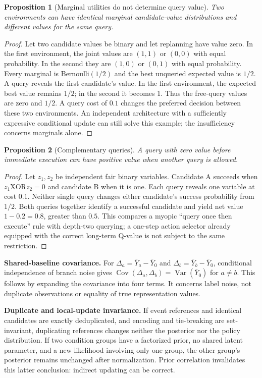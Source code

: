 \documentclass[sigconf,anonymous,review]{acmart}
\DeclareMathOperator{\Cov}{Cov}
\DeclareMathOperator{\Var}{Var}
\theoremstyle{zhplain}
\newtheorem{proposition}{命题}
\newtheorem{proposition}{Proposition}
\begin{document}
\begin{proposition}[Marginal utilities do not determine query value]
Two environments can have identical marginal candidate-value distributions and different values for the same query.
\end{proposition}
\begin{proof}
Let two candidate values be binary and let replanning have value zero. In the first environment, the joint values are \((1,1)\) or \((0,0)\) with equal probability. In the second they are \((1,0)\) or \((0,1)\) with equal probability. Every marginal is Bernoulli\((1/2)\) and the best unqueried expected value is \(1/2\). A query reveals the first candidate's value. In the first environment, the expected best value remains \(1/2\); in the second it becomes \(1\). Thus the free-query values are zero and \(1/2\). A query cost of \(0.1\) changes the preferred decision between these two environments. An independent architecture with a sufficiently expressive conditional update can still solve this example; the insufficiency concerns marginals alone.
\end{proof}

\begin{proposition}[Complementary queries]
A query with zero value before immediate execution can have positive value when another query is allowed.
\end{proposition}
\begin{proof}
Let \(z_1,z_2\) be independent fair binary variables. Candidate A succeeds when \(z_1\mathbin{\mathrm{XOR}}z_2=0\) and candidate B when it is one. Each query reveals one variable at cost \(0.1\). Neither single query changes either candidate's success probability from \(1/2\). Both queries together identify a successful candidate and yield net value \(1-0.2=0.8\), greater than \(0.5\). This compares a myopic ``query once then execute'' rule with depth-two querying; a one-step action selector already equipped with the correct long-term Q-value is not subject to the same restriction.
\end{proof}

\textbf{Shared-baseline covariance.} For \(\Delta_a=\bar Y_a-\bar Y_0\) and \(\Delta_b=\bar Y_b-\bar Y_0\), conditional independence of branch noise gives \(\Cov(\Delta_a,\Delta_b)=\Var(\bar Y_0)\) for \(a\ne b\). This follows by expanding the covariance into four terms. It concerns label noise, not duplicate observations or equality of true representation values.

\textbf{Duplicate and local-update invariance.} If event references and identical candidates are exactly deduplicated, and encoding and tie-breaking are set-invariant, duplicating references changes neither the posterior nor the policy distribution. If two condition groups have a factorized prior, no shared latent parameter, and a new likelihood involving only one group, the other group's posterior remains unchanged after normalization. Prior correlation invalidates this latter conclusion: indirect updating can be correct.
\end{document}
